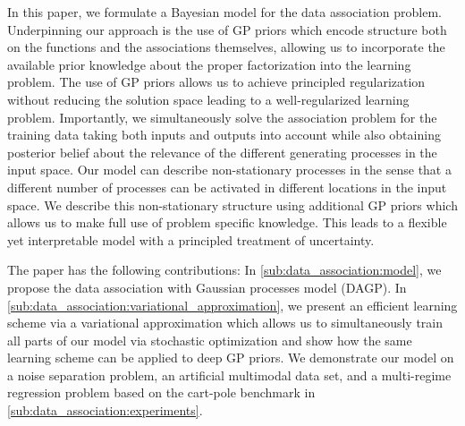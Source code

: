 In this paper, we formulate a Bayesian model for the data association problem.
Underpinning our approach is the use of GP priors which encode structure both on the functions and the associations themselves, allowing us to incorporate the available prior knowledge about the proper factorization into the learning problem.
The use of GP priors allows us to achieve principled regularization without reducing the solution space leading to a well-regularized learning problem.
Importantly, we simultaneously solve the association problem for the training data taking both inputs and outputs into account while also obtaining posterior belief about the relevance of the different generating processes in the input space.
Our model can describe non-stationary processes in the sense that a different number of processes can be activated in different locations in the input space.
We describe this non-stationary structure using additional GP priors which allows us to make full use of problem specific knowledge.
This leads to a flexible yet interpretable model with a principled treatment of uncertainty.

The paper has the following contributions:
In \cref{sub:data_association:model}, we propose the data association with Gaussian processes model (DAGP).
In \cref{sub:data_association:variational_approximation}, we present an efficient learning scheme via a variational approximation which allows us to simultaneously train all parts of our model via stochastic optimization and show how the same learning scheme can be applied to deep GP priors.
We demonstrate our model on a noise separation problem, an artificial multimodal data set, and a multi-regime regression problem based on the cart-pole benchmark in \cref{sub:data_association:experiments}.


